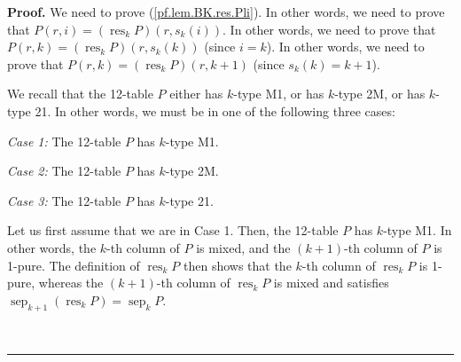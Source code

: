\documentclass[numbers=enddot,12pt,final,onecolumn,notitlepage]{scrartcl}%
\theoremstyle{definition}
\newenvironment{proof}[1][Proof]{\noindent\textbf{#1.} }{\ \rule{0.5em}{0.5em}}
\newenvironment{verlong}{}{}
\begin{document}
\begin{verlong}
\begin{proof}
We need to prove (\ref{pf.lem.BK.res.Pli}). In other words, we need to prove
that $P\left(  r,i\right)  =\left(  \operatorname*{res}\nolimits_{k}P\right)
\left(  r,s_{k}\left(  i\right)  \right)  $. In other words, we need to prove
that $P\left(  r,k\right)  =\left(  \operatorname*{res}\nolimits_{k}P\right)
\left(  r,s_{k}\left(  k\right)  \right)  $ (since $i=k$). In other words, we
need to prove that $P\left(  r,k\right)  =\left(  \operatorname*{res}%
\nolimits_{k}P\right)  \left(  r,k+1\right)  $ (since $s_{k}\left(  k\right)
=k+1$).

We recall that the 12-table $P$ either has $k$-type M1, or has $k$-type 2M, or
has $k$-type 21. In other words, we must be in one of the following three cases:

\textit{Case 1:} The 12-table $P$ has $k$-type M1.

\textit{Case 2:} The 12-table $P$ has $k$-type 2M.

\textit{Case 3:} The 12-table $P$ has $k$-type 21.

Let us first assume that we are in Case 1. Then, the 12-table $P$ has $k$-type
M1. In other words, the $k$-th column of $P$ is mixed, and the $\left(
k+1\right)  $-th column of $P$ is 1-pure. The definition of
$\operatorname*{res}\nolimits_{k}P$ then shows that the $k$-th column of
$\operatorname*{res}_{k}P$ is 1-pure, whereas the $\left(  k+1\right)  $-th
column of $\operatorname*{res}\nolimits_{k}P$ is mixed and satisfies
$\operatorname*{sep}\nolimits_{k+1}\left(  \operatorname*{res}\nolimits_{k}%
P\right)  =\operatorname*{sep}\nolimits_{k}P$.


\end{proof}
\end{verlong}
\end{document}
